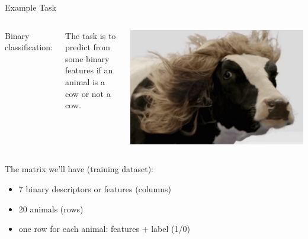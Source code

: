 \documentclass[15pt]{beamer}
\begin{document}
\begin{frame}{Example Task}
    \begin{columns}[c]
        \hspace{8mm}\large{Binary classification:}
        \vspace{3mm}

        \normalsize
        \hspace{3.5mm}The task is to predict from \\
        \hspace{3.5mm}some binary \alert{features} if an \\
        \hspace{3.5mm}animal is a \alert{cow} or \alert{not a cow}.

        \vspace{1mm}

        \includegraphics[scale=.28]{img/haircow.png}
    \end{columns}

    \vspace{4mm}

    The matrix we'll have (\alert{training dataset}):
    \vspace{2mm}
    \begin{itemize}\itemsep0.5em
        \item 7 binary descriptors or features (columns)
        \item 20 animals (rows)
        \item one row for each animal: features + label (1/0)
    \end{itemize}
\end{frame}
\end{document}
